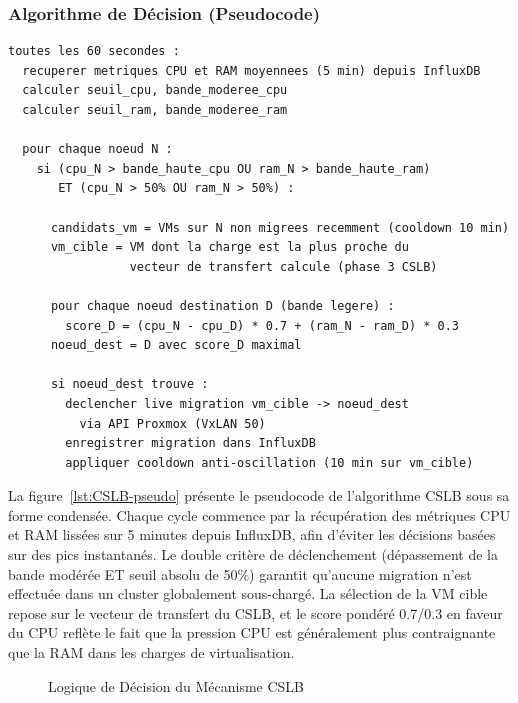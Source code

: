 \subsubsection{Algorithme de Décision (Pseudocode)}

\begin{lstlisting}[style=sonacode,language={},caption={Pseudocode de l'algorithme CSLB},label={lst:CSLB-pseudo}]
toutes les 60 secondes :
  recuperer metriques CPU et RAM moyennees (5 min) depuis InfluxDB
  calculer seuil_cpu, bande_moderee_cpu
  calculer seuil_ram, bande_moderee_ram

  pour chaque noeud N :
    si (cpu_N > bande_haute_cpu OU ram_N > bande_haute_ram)
       ET (cpu_N > 50% OU ram_N > 50%) :

      candidats_vm = VMs sur N non migrees recemment (cooldown 10 min)
      vm_cible = VM dont la charge est la plus proche du
                 vecteur de transfert calcule (phase 3 CSLB)

      pour chaque noeud destination D (bande legere) :
        score_D = (cpu_N - cpu_D) * 0.7 + (ram_N - ram_D) * 0.3
      noeud_dest = D avec score_D maximal

      si noeud_dest trouve :
        declencher live migration vm_cible -> noeud_dest
          via API Proxmox (VxLAN 50)
        enregistrer migration dans InfluxDB
        appliquer cooldown anti-oscillation (10 min sur vm_cible)
\end{lstlisting}

\par La figure~\ref{lst:CSLB-pseudo} présente le pseudocode de l'algorithme CSLB sous sa forme condensée. Chaque cycle commence par la récupération des métriques CPU et RAM lissées sur 5 minutes depuis InfluxDB, afin d'éviter les décisions basées sur des pics instantanés. Le double critère de déclenchement (dépassement de la bande modérée ET seuil absolu de 50\%) garantit qu'aucune migration n'est effectuée dans un cluster globalement sous-chargé. La sélection de la VM cible repose sur le vecteur de transfert du CSLB, et le score pondéré 0.7/0.3 en faveur du CPU reflète le fait que la pression CPU est généralement plus contraignante que la RAM dans les charges de virtualisation.\\

\begin{figure}[H]
    \begin{center}
        
        \caption{Logique de Décision du Mécanisme CSLB}
        \label{fig:CSLB-flowchart}
    \end{center}
\end{figure}

